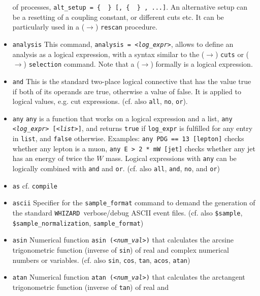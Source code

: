 \documentclass[12pt]{book}
\newcommand{\ttt}[1]{\texttt{#1}}
\newcommand{\whizard}{\ttt{WHIZARD}}
\begin{document}
\begin{itemize}
of processes, \ttt{alt\_setup = \{ {\em <setup1>} \} [, \{ {\em <setup2>} \} ,
  ...]}. An alternative setup can be a resetting of a coupling
constant, or different cuts etc. It can be particularly used in a
($\to$) \ttt{rescan} procedure.
\item
\ttt{analysis} \newline
This command, \ttt{analysis = {\em <log\_expr>}}, allows to define an
analysis as a logical expression, with a syntax similar to the ($\to$)
\ttt{cuts} or ($\to$) \ttt{selection} command. Note that a ($\to$)
formally is a logical expression.
\item
\ttt{and} \newline
This is the standard two-place logical connective that has the value
true if both of its operands are true, otherwise a value of false. It
is applied to logical values, e.g. cut expressions. (cf. also
\ttt{all}, \ttt{no}, \ttt{or}).
\item
\ttt{any} \newline
\ttt{any} is a function that works on a logical expression and a list,
\ttt{any {\em <log\_expr>} [{\em <list>}]}, and returns \ttt{true} if
\ttt{log\_expr} is fulfilled for any entry in \ttt{list}, and
\ttt{false} otherwise. Examples: \ttt{any PDG == 13 [lepton]} checks
whether any lepton is a muon, \ttt{any E > 2 * mW [jet]} checks
whether any jet has an energy of twice the $W$ mass. Logical
expressions with \ttt{any} can be logically combined with \ttt{and}
and \ttt{or}. (cf. also \ttt{all}, \ttt{and}, \ttt{no}, and \ttt{or})
\item
\ttt{as} \newline
cf. \ttt{compile}
\item
\ttt{ascii} \newline
Specifier for the \ttt{sample\_format} command to demand the
generation of the standard \whizard\ verbose/debug ASCII event
files. (cf. also \ttt{\$sample}, \ttt{\$sample\_normalization},
\ttt{sample\_format})
\item
\ttt{asin} \newline
Numerical function \ttt{asin ({\em <num\_val>})} that calculates the
arcsine trigonometric function (inverse of \ttt{sin}) of real and
complex numerical numbers or variables. (cf. also \ttt{sin},
\ttt{cos}, \ttt{tan}, \ttt{acos}, \ttt{atan})
\item
\ttt{atan} \newline
Numerical function \ttt{atan ({\em <num\_val>})} that calculates the
arctangent trigonometric function (inverse of \ttt{tan}) of real and

\end{itemize}
\end{document}
